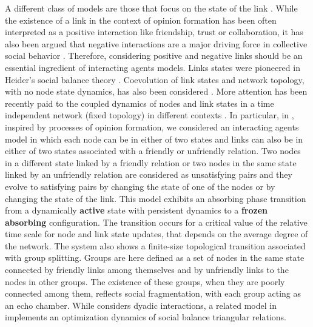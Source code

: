 \documentclass[aps,pre,notitlepage]{revtex4-1}
\begin{document}
A different class of models are those that focus on the state of the link \cite{fernandez2012dynamics}. While the existence of a link in the context of opinion formation has been often interpreted as a positive interaction like friendship, trust or collaboration, it has also been argued that negative interactions are a major driving force in collective social behavior \cite{bliuc2015public,hutchings2019prejudice}. Therefore, considering positive and negative links should be an essential ingredient of interacting agents models. Links states were pioneered in Heider's social balance theory \cite{heider1946attitudes,heider2013psychology,antal2005dynamics,antal2006social,szell2010multirelational,marvel2011continuous}. Coevolution of link states and network topology, with no node state dynamics, has also been considered \cite{carro2014fragmentation}. More attention has been recently paid to the coupled dynamics of nodes and link states in a time independent network (fixed topology) in different contexts \cite{singh2014extreme,saeedian2017epidemic,carro2016coupled,pham2020effect,saeedian2019absorbing}. In particular, in \cite{saeedian2019absorbing}, inspired by processes of opinion formation, we considered an interacting agents model in which each node can be in either of two states and links can also be in either of two states associated with a friendly or unfriendly relation. Two nodes in a different state linked by a friendly relation or two nodes in the same state linked by an unfriendly relation are considered as unsatisfying pairs and they evolve to satisfying pairs by changing the state of one of the nodes or by changing the state of the link. This model exhibits an absorbing phase transition from a dynamically \textbf{active} state with persistent dynamics to a \textbf{frozen absorbing} configuration. The transition occurs for a critical value of the relative time scale for node and link state updates, that depends on the average degree of the network. The system also shows a finite-size topological transition associated with group splitting. Groups are here defined as a set of nodes in the same state connected by friendly links among themselves and by unfriendly links to the nodes in other groups. The existence of these groups, when they are poorly connected among them, reflects social fragmentation, with each group acting as an echo chamber. While \cite{saeedian2019absorbing} considers dyadic interactions, a related model in \cite{pham2020effect} implements an optimization dynamics of social balance triangular relations.
\end{document}
